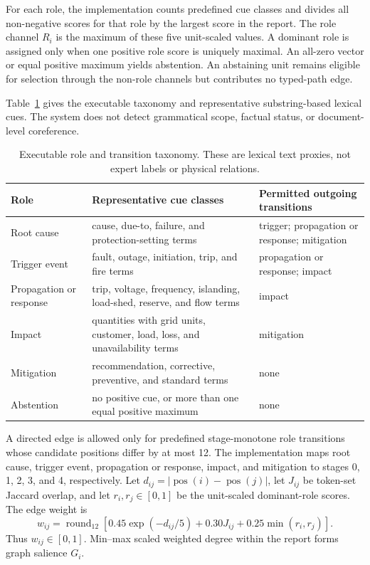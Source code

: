 \documentclass[applsci,article,submit,moreauthors]{Definitions/mdpi}
\begin{document}
For each role, the implementation counts predefined cue classes and divides all non-negative scores for that role by the largest score in the report. The role channel $R_i$ is the maximum of these five unit-scaled values. A dominant role is assigned only when one positive role score is uniquely maximal. An all-zero vector or equal positive maximum yields abstention. An abstaining unit remains eligible for selection through the non-role channels but contributes no typed-path edge.

Table~\ref{tab:taxonomy} gives the executable taxonomy and representative substring-based lexical cues. The system does not detect grammatical scope, factual status, or document-level coreference.

\begin{table}[H]
\caption{Executable role and transition taxonomy. These are lexical text proxies, not expert labels or physical relations.}
\label{tab:taxonomy}\centering\small
\begin{tabularx}{\textwidth}{p{2.2cm}XX}
\toprule
Role & Representative cue classes & Permitted outgoing transitions\\
\midrule
Root cause & cause, due-to, failure, and protection-setting terms & trigger; propagation or response; mitigation\\
Trigger event & fault, outage, initiation, trip, and fire terms & propagation or response; impact\\
Propagation or response & trip, voltage, frequency, islanding, load-shed, reserve, and flow terms & impact\\
Impact & quantities with grid units, customer, load, loss, and unavailability terms & mitigation\\
Mitigation & recommendation, corrective, preventive, and standard terms & none\\
Abstention & no positive cue, or more than one equal positive maximum & none\\
\bottomrule
\end{tabularx}
\end{table}

A directed edge is allowed only for predefined stage-monotone role transitions whose candidate positions differ by at most 12. The implementation maps root cause, trigger event, propagation or response, impact, and mitigation to stages 0, 1, 2, 3, and 4, respectively. Let $d_{ij}=|\operatorname{pos}(i)-\operatorname{pos}(j)|$, let $J_{ij}$ be token-set Jaccard overlap, and let $r_i,r_j\in[0,1]$ be the unit-scaled dominant-role scores. The edge weight is
\[
w_{ij}=\operatorname{round}_{12}\!\left[0.45\exp(-d_{ij}/5)+0.30J_{ij}+0.25\min(r_i,r_j)\right].
\]
Thus $w_{ij}\in[0,1]$. Min--max scaled weighted degree within the report forms graph salience $G_i$.
\end{document}
